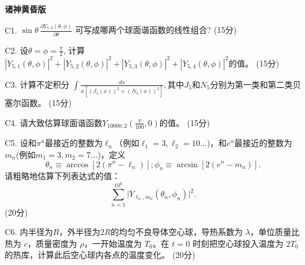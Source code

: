 \documentclass[12pt,CJK]{article}
\def\mark#1{{\color{blue} (#1分)}}
\begin{document}
{\vskip 0.1in}

{\bf 诸神黄昏版}

\bitem
\item[C1.]{$\sin\theta \,\frac{\partial Y_{7,3}(\theta,\phi)}{\partial \theta} $ 可写成哪两个球面谐函数的线性组合? \mark{15}}
\item[C2.]{设$\theta = \phi =  \frac{\pi}{2}$, 计算$|Y_{5, 1}(\theta,\phi)|^2+  |Y_{5, 2}(\theta,\phi)|^2+ |Y_{5, 3}(\theta,\phi)|^2+|Y_{5, 4}(\theta,\phi)|^2$的值。\mark{15}}
\item[C3.]{计算不定积分 $\int \frac{dx}{x\left[\left(J_5(x)\right)^2+\left(N_5(x)\right)^2\right]},$其中$J_5$和$N_5$分别为第一类和第二类贝塞尔函数。  \mark{15}}
\item[C4.]{请大致估算球面谐函数$Y_{10000,2}\left(\frac{\pi}{100}, 0\right)$的值。\mark{15}}
\item[C5.]{设和$\pi^n$最接近的整数为$\ell_n$（例如$\ell_1=3, \ell_2=10\ldots$)，和$e^n$最接近的整数为$m_n$(例如$m_1=3, m_2 =7\ldots$)，定义
    $$\theta_n \equiv \arccos\left[2\left(\pi^n-\ell_n\right)\right]; \phi_n\equiv \arcsin\left[2\left(e^n-m_n\right)\right].$$ 请粗略地估算下列表达式的值：
    $$\sum_{n=1}^{10^6}\lvert Y_{\ell_n,m_n} \left(\theta_n, \phi_n\right)\rvert^2.$$
    \mark{20}}  
\item[C6.]{内半径为$R$，外半径为$2R$的均匀不良导体空心球，导热系数为 $\lambda$，单位质量比热为 $c$，质量密度为 $\rho$，一开始温度为 $T_0$。在 $t=0$ 时刻把空心球投入温度为 $2T_0$ 的热库，计算此后空心球内各点的温度变化。\mark{20}}  
\eitem



\ech
\end{document}
